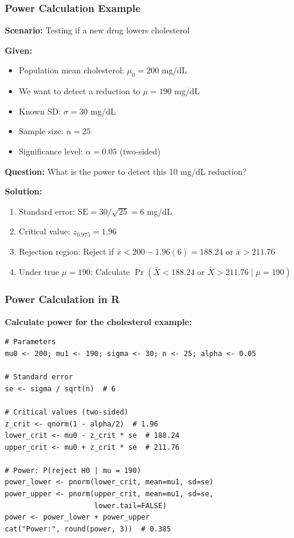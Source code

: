 \documentclass{beamer}
\begin{document}
\begin{frame}
\frametitle{Power Calculation Example}
\textbf{Scenario:} Testing if a new drug lowers cholesterol

\vspace{0.3cm}
\textbf{Given:}
\begin{itemize}
\item Population mean cholesterol: $\mu_0 = 200$ mg/dL
\item We want to detect a reduction to $\mu = 190$ mg/dL
\item Known SD: $\sigma = 30$ mg/dL
\item Sample size: $n = 25$
\item Significance level: $\alpha = 0.05$ (two-sided)
\end{itemize}

\vspace{0.3cm}
\textbf{Question:} What is the power to detect this 10 mg/dL reduction?

\vspace{0.3cm}
\textbf{Solution:}
\begin{enumerate}
\item Standard error: $\text{SE} = 30/\sqrt{25} = 6$ mg/dL
\item Critical value: $z_{0.975} = 1.96$
\item Rejection region: Reject if $\bar{x} < 200 - 1.96(6) = 188.24$ or $\bar{x} > 211.76$
\item Under true $\mu = 190$: Calculate $\Pr(\bar{X} < 188.24 \text{ or } \bar{X} > 211.76 \mid \mu = 190)$
\end{enumerate}
\end{frame}

\begin{frame}[fragile]
\frametitle{Power Calculation in R}
\textbf{Calculate power for the cholesterol example:}

\vspace{0.2cm}
\footnotesize
\begin{verbatim}
# Parameters
mu0 <- 200; mu1 <- 190; sigma <- 30; n <- 25; alpha <- 0.05

# Standard error
se <- sigma / sqrt(n)  # 6

# Critical values (two-sided)
z_crit <- qnorm(1 - alpha/2)  # 1.96
lower_crit <- mu0 - z_crit * se  # 188.24
upper_crit <- mu0 + z_crit * se  # 211.76

# Power: P(reject H0 | mu = 190)
power_lower <- pnorm(lower_crit, mean=mu1, sd=se)
power_upper <- pnorm(upper_crit, mean=mu1, sd=se,
                     lower.tail=FALSE)
power <- power_lower + power_upper
cat("Power:", round(power, 3))  # 0.385
\end{verbatim}
\end{frame}
\end{document}
